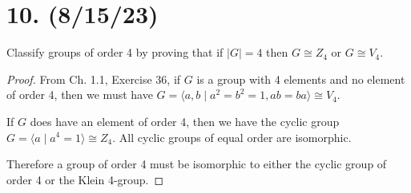 \documentclass{article}
\begin{document}
\section*{10. (8/15/23)}

Classify groups of order 4 by proving that if $|G| = 4$ then $G \cong Z_4$ or $G \cong V_4$.

\begin{proof}
    From Ch. 1.1, Exercise 36, if $G$ is a group with 4 elements and no element of order 4, then we must have $G = \langle a, b \mid a^2 = b^2 = 1, ab = ba \rangle \cong V_4$.

    If $G$ does have an element of order 4, then we have the cyclic group $G = \langle a \mid a^4 = 1 \rangle \cong Z_4$. All cyclic groups of equal order are isomorphic.

    Therefore a group of order 4 must be isomorphic to either the cyclic group of order 4 or the Klein 4-group.
\end{proof}
\end{document}
